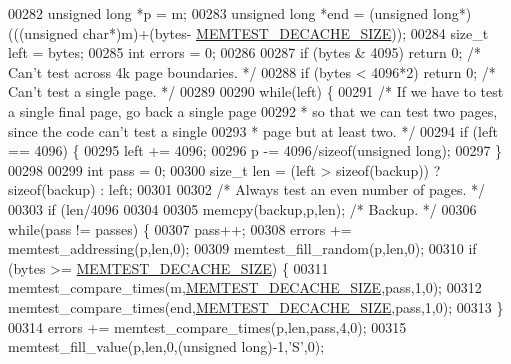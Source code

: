 \begin{DoxyCode}
{{{{00282     \textcolor{keywordtype}{unsigned} \textcolor{keywordtype}{long} *p = m;
00283     \textcolor{keywordtype}{unsigned} \textcolor{keywordtype}{long} *end = (\textcolor{keywordtype}{unsigned} \textcolor{keywordtype}{long}*) (((\textcolor{keywordtype}{unsigned} \textcolor{keywordtype}{char}*)m)+(bytes-
      \hyperlink{memtest_8c_af445933770893d6bc1b2a1cb3c99dfa5}{MEMTEST\_DECACHE\_SIZE}));
00284     size\_t left = bytes;
00285     \textcolor{keywordtype}{int} errors = 0;
00286 
00287     \textcolor{keywordflow}{if} (bytes & 4095) \textcolor{keywordflow}{return} 0; \textcolor{comment}{/* Can't test across 4k page boundaries. */}
00288     \textcolor{keywordflow}{if} (bytes < 4096*2) \textcolor{keywordflow}{return} 0; \textcolor{comment}{/* Can't test a single page. */}
00289 
00290     \textcolor{keywordflow}{while}(left) \{
00291         \textcolor{comment}{/* If we have to test a single final page, go back a single page}
00292 \textcolor{comment}{         * so that we can test two pages, since the code can't test a single}
00293 \textcolor{comment}{         * page but at least two. */}
00294         \textcolor{keywordflow}{if} (left == 4096) \{
00295             left += 4096;
00296             p -= 4096/\textcolor{keyword}{sizeof}(\textcolor{keywordtype}{unsigned} \textcolor{keywordtype}{long});
00297         \}
00298 
00299         \textcolor{keywordtype}{int} pass = 0;
00300         size\_t len = (left > \textcolor{keyword}{sizeof}(backup)) ? \textcolor{keyword}{sizeof}(backup) : left;
00301 
00302         \textcolor{comment}{/* Always test an even number of pages. */}
00303         \textcolor{keywordflow}{if} (len/4096 %
00304 
00305         memcpy(backup,p,len); \textcolor{comment}{/* Backup. */}
00306         \textcolor{keywordflow}{while}(pass != passes) \{
00307             pass++;
00308             errors += memtest\_addressing(p,len,0);
00309             memtest\_fill\_random(p,len,0);
00310             \textcolor{keywordflow}{if} (bytes >= \hyperlink{memtest_8c_af445933770893d6bc1b2a1cb3c99dfa5}{MEMTEST\_DECACHE\_SIZE}) \{
00311                 memtest\_compare\_times(m,\hyperlink{memtest_8c_af445933770893d6bc1b2a1cb3c99dfa5}{MEMTEST\_DECACHE\_SIZE},pass,1,0);
00312                 memtest\_compare\_times(end,\hyperlink{memtest_8c_af445933770893d6bc1b2a1cb3c99dfa5}{MEMTEST\_DECACHE\_SIZE},pass,1,0);
00313             \}
00314             errors += memtest\_compare\_times(p,len,pass,4,0);
00315             memtest\_fill\_value(p,len,0,(\textcolor{keywordtype}{unsigned} \textcolor{keywordtype}{long})-1,\textcolor{stringliteral}{'S'},0);
}}}}
\end{DoxyCode}
